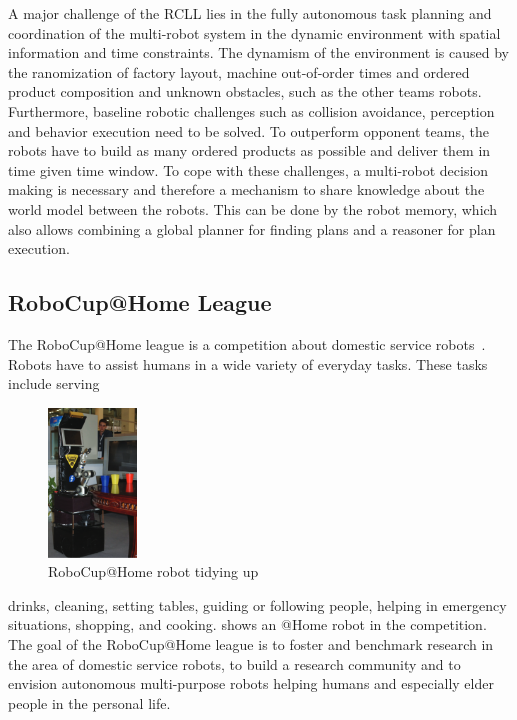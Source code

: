 A major challenge of the RCLL lies in the fully autonomous task
planning and coordination of the multi-robot system in the dynamic
environment with spatial information and time constraints. The
dynamism of the environment is caused by the ranomization of factory
layout, machine out-of-order times and ordered product composition and
unknown obstacles, such as the other teams robots. Furthermore,
baseline robotic challenges such as collision avoidance, perception
and behavior execution need to be solved. To outperform opponent
teams, the robots have to build as many ordered products as possible
and deliver them in time given time window.  To cope with these
challenges, a multi-robot decision making is necessary and therefore a
mechanism to share knowledge about the world model between the
robots. This can be done by the robot memory, which also allows
combining a global planner for finding plans and a reasoner for plan
execution.

\subsection{RoboCup@Home League}
The RoboCup@Home league is a competition about domestic service
robots~\cite{wisspeintner2009robocup}. Robots have to assist
humans in a wide variety of everyday tasks. These tasks include
serving
\begin{figure}
  \centering
  \includegraphics[height=150px]{img/ceasar}%
  \caption{RoboCup@Home robot tidying up~\cite{wisspeintner2009robocup}}
  \vspace{-3mm}
  \label{fig:athome}
\end{figure}
drinks, cleaning, setting tables, guiding or following people,
helping in emergency situations, shopping, and cooking.
 shows an @Home robot in the
competition.
%
The goal of the RoboCup@Home league is to foster and benchmark
research in the area of domestic service robots, to build a research
community and to envision autonomous multi-purpose robots helping
humans and especially elder people in the personal life.

